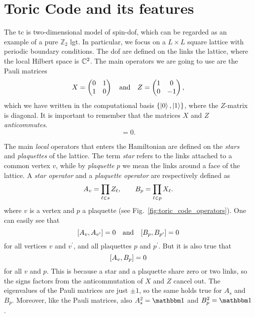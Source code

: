 \section{Toric Code and its features}
\label{sec:toric_code_and_its_features}

The \ac{tc} is two-dimensional model of spin-\onehalf \ac{dof}, which can be regarded as an example of a pure $\mathbb{Z}_2$ \ac{lgt}.
In particular, we focus on a $L \times L$ square lattice with periodic boundary conditions.
The \ac{dof} are defined on the links the lattice, where the local Hilbert space is $\mathbb{C}^2$.
The main operators we are going to use are the Pauli matrices
\begin{equation}
    X = \begin{pmatrix}
        0 & 1 \\ 1 & 0
    \end{pmatrix}
    \qand
    Z = \begin{pmatrix}
        1 & 0 \\ 0 & -1
    \end{pmatrix},
    \label{eq:matrices_X_Z}
\end{equation}
which we have written in the computational basis $\{\ket{0}, \ket{1}\}$, where the $Z$-matrix is diagonal.
It is important to remember that the matrices $X$ and $Z$ \emph{anticommutes}.
\begin{equation}
    [X, Z] = 0.
\end{equation}

The main \emph{local} operators that enters the Hamiltonian are defined on the \emph{stars} and \emph{plaquettes} of the lattice.
The term \emph{star} refers to the links attached to a common vertex $v$, while by \emph{plaquette} $p$ we mean the links around a face of the lattice.
A \emph{star operator} and a \emph{plaquette operator} are respectively defined as
\begin{equation}
    A_v = \prod_{\ell \in s} Z_\ell, \qquad
    B_p = \prod_{\ell \in p} X_\ell.
    \label{eq:star_plaq_op_def}
\end{equation}
where $v$ is a vertex and $p$ a plaquette (see Fig.~\ref{fig:toric_code_operators}).
One can easily see that
\begin{equation}
    \comm{A_v}{A_{v^{\prime}}} = 0 \qand
    \comm{B_p}{B_{p^{\prime}}} = 0
    \label{eq:star_plaq_op_comm_1}
\end{equation}
for all vertices $v$ and $v^{\prime} $, and all plaquettes $p$ and $p^{\prime} $.
But it is also true that
\begin{equation}
    \comm{A_v}{B_p} = 0
    \label{eq:star_plaq_op_comm_2}
\end{equation}
for all $v$ and $p$.
This is because a star and a plaquette share zero or two links, so the signs factors from the anticommutation of $X$ and $Z$ cancel out.
The eigenvalues of the Pauli matrices are just $\pm 1$, so the same holds true for $A_s$ and $B_p$.
Moreover, like the Pauli matrices, also $A_s^2 = \identity$ and $B_p^2 = \identity$.


